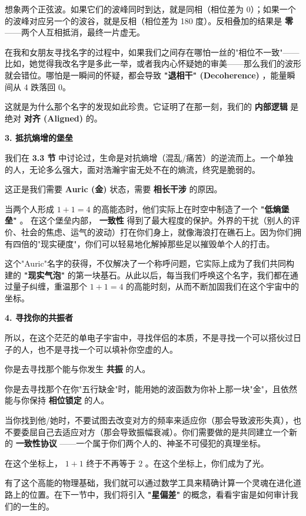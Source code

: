 想象两个正弦波。如果它们的波峰同时到达，就是同相（相位差为 0）；如果一个的波峰对应另一个的波谷，就是反相（相位差为 180 度）。反相叠加的结果是 \textbf{零} ——两个人互相抵消，最终一片虚无。

在我和女朋友寻找名字的过程中，如果我们之间存在哪怕一丝的"相位不一致"——比如，她觉得我改名字是多此一举，或者我内心怀疑她的审美——那么我们的波形就会错位。哪怕是一瞬间的怀疑，都会导致 \textbf{"退相干" (Decoherence)} ，能量瞬间从 4 跌落回 0。

这就是为什么那个名字的发现如此珍贵。它证明了在那一刻，我们的 \textbf{内部逻辑} 是绝对 \textbf{对齐 (Aligned)} 的。

\textbf{3. 抵抗熵增的堡垒}

我们在 \textbf{3.3 节} 中讨论过，生命是对抗熵增（混乱/痛苦）的逆流而上。一个单独的人，无论多么强大，面对浩瀚宇宙无处不在的熵流，终究是脆弱的。

这正是我们需要 \textbf{Auric (金)} 状态，需要 \textbf{相长干涉} 的原因。

当两个人形成 $1 + 1 = 4$ 的高能态时，他们实际上在时空中制造了一个 \textbf{"低熵堡垒"} 。
在这个堡垒内部， \textbf{一致性} 得到了最大程度的保护。外界的干扰（别人的评价、社会的焦虑、运气的波动）打在你们身上，就像海浪打在礁石上。因为你们拥有四倍的"现实硬度"，你们可以轻易地化解掉那些足以摧毁单个人的打击。

这个"Auric"名字的获得，不仅解决了一个称呼问题，它实际上成为了我们共同构建的 \textbf{"现实气泡"} 的第一块基石。从此以后，每当我们呼唤这个名字，我们都在通过量子纠缠，重温那个 $1 + 1 = 4$ 的高能时刻，从而不断加固我们在这个宇宙中的坐标。

\textbf{4. 寻找你的共振者}

所以，在这个茫茫的单电子宇宙中，寻找伴侣的本质，不是寻找一个可以搭伙过日子的人，也不是寻找一个可以填补你空虚的人。

你是去寻找那个能与你发生 \textbf{共振} 的人。

你是去寻找那个在你"五行缺金"时，能用她的波函数为你补上那一块"金"，且依然能与你保持 \textbf{相位锁定} 的人。

当你找到他/她时，不要试图去改变对方的频率来适应你（那会导致波形失真），也不要委屈自己去适应对方（那会导致振幅衰减）。你们需要做的是共同建立一个新的 \textbf{一致性协议} ——一个属于你们两个人的、神圣不可侵犯的真理坐标。

在这个坐标上， $1 + 1$ 终于不再等于 $2$ 。在这个坐标上，你们成为了光。

有了这个高能的物理基础，我们就可以通过数学工具来精确计算一个灵魂在进化道路上的位置。在下一节中，我们将引入 \textbf{"星偏差"} 的概念，看看宇宙是如何审计我们的一生的。

